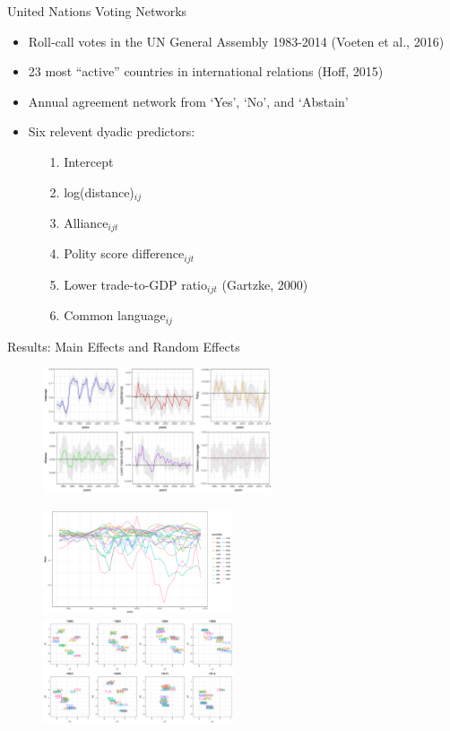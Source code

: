 \documentclass[10pt]{beamer}
\def\bni{\begin{itemize}} \def\ei{\end{itemize}}
\theoremstyle{definition}
\theoremstyle{remark}
\begin{document}
 \begin{frame}{United Nations Voting Networks}
 	\bni
 	\item Roll-call votes in the UN General Assembly 1983-2014 (Voeten et al.,  2016)	\vspace{0.4cm}
 	\item 23 most “active” countries in international relations (Hoff, 2015)	\vspace{0.4cm}
 	\item Annual agreement network from `Yes', `No', and `Abstain'	\vspace{0.4cm}
 	\item Six relevent dyadic predictors:
 	\begin{itemize}
 		\item [1.] Intercept
 		\item [2.] log(distance)$_{ij}$
 		\item [3.] Alliance$_{ijt}$
 		\item [4.] Polity score difference$_{ijt}$
 		\item [5.] Lower trade-to-GDP ratio$_{ijt}$ (Gartzke, 2000)
 		\item [6.] Common language$_{ij}$
 	\end{itemize}
 	\ei
\end{frame}

\begin{frame}{Results: Main Effects and Random Effects}
	\begin{figure}[ht]
		\begin{center}
			\includegraphics[width=0.6\textwidth]{betas.pdf}	
		\end{center}
	\end{figure}
		\begin{figure}[ht]
			\begin{center}
							\includegraphics[width=0.5\textwidth]{theta.pdf}	
				\includegraphics[width=0.5\textwidth]{UDU.pdf}	
			\end{center}
		\end{figure}
\end{frame}
\end{document}
